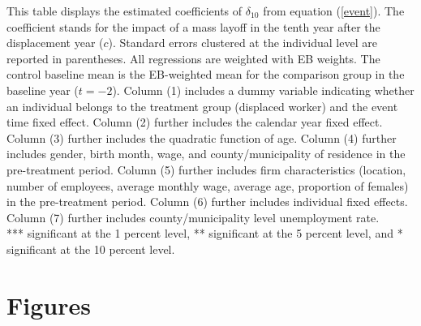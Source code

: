 \documentclass[12pt]{article}
\begin{document}
\vspace{-2em}
\begin{singlespace}
        \begin{footnotesize}
        		 This table displays the estimated coefficients of $\delta_{10}$ from equation (\ref{event}). The coefficient stands for the impact of a mass layoff in the tenth year after the displacement year ($c$). Standard errors clustered at the individual level are reported in parentheses. All regressions are weighted with EB weights. The control baseline mean is the EB-weighted mean for the comparison group in the baseline year ($t=-2$). Column (1) includes a dummy variable indicating whether an individual belongs to the treatment group (displaced worker) and the event time fixed effect. Column (2) further includes the calendar year fixed effect. Column (3) further includes the quadratic function of age. Column (4) further includes gender, birth month, wage, and county/municipality of residence in the pre-treatment period. Column (5) further includes firm characteristics (location, number of employees, average monthly wage, average age, proportion of females) in the pre-treatment period. Column (6) further includes individual fixed effects. Column (7) further includes county/municipality level unemployment rate. 
		 \\
		*** significant at the 1 percent level, ** significant at the 5 percent level, and * significant at the 10 percent level.
        \end{footnotesize}
\end{singlespace}


\newpage

\section*{Figures}
\end{document}
